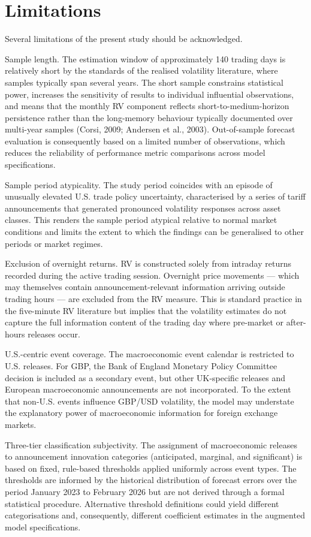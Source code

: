 \documentclass[12pt,a4paper]{report}
\begin{document}
\section{Limitations}
Several limitations of the present study should be acknowledged.

Sample length. The estimation window of approximately 140 trading days is relatively short by the standards of the realised volatility literature, where samples typically span several years. The short sample constrains statistical power, increases the sensitivity of results to individual influential observations, and means that the monthly RV component reflects short-to-medium-horizon persistence rather than the long-memory behaviour typically documented over multi-year samples (Corsi, 2009; Andersen et al., 2003). Out-of-sample forecast evaluation is consequently based on a limited number of observations, which reduces the reliability of performance metric comparisons across model specifications.

Sample period atypicality. The study period coincides with an episode of unusually elevated U.S. trade policy uncertainty, characterised by a series of tariff announcements that generated pronounced volatility responses across asset classes. This renders the sample period atypical relative to normal market conditions and limits the extent to which the findings can be generalised to other periods or market regimes.

Exclusion of overnight returns. RV is constructed solely from intraday returns recorded during the active trading session. Overnight price movements --- which may themselves contain announcement-relevant information arriving outside trading hours --- are excluded from the RV measure. This is standard practice in the five-minute RV literature but implies that the volatility estimates do not capture the full information content of the trading day where pre-market or after-hours releases occur.

U.S.-centric event coverage. The macroeconomic event calendar is restricted to U.S. releases. For GBP, the Bank of England Monetary Policy Committee decision is included as a secondary event, but other UK-specific releases and European macroeconomic announcements are not incorporated. To the extent that non-U.S. events influence GBP/USD volatility, the model may understate the explanatory power of macroeconomic information for foreign exchange markets.

Three-tier classification subjectivity. The assignment of macroeconomic releases to announcement innovation categories (anticipated, marginal, and significant) is based on fixed, rule-based thresholds applied uniformly across event types. The thresholds are informed by the historical distribution of forecast errors over the period January 2023 to February 2026 but are not derived through a formal statistical procedure. Alternative threshold definitions could yield different categorisations and, consequently, different coefficient estimates in the augmented model specifications.
\end{document}
